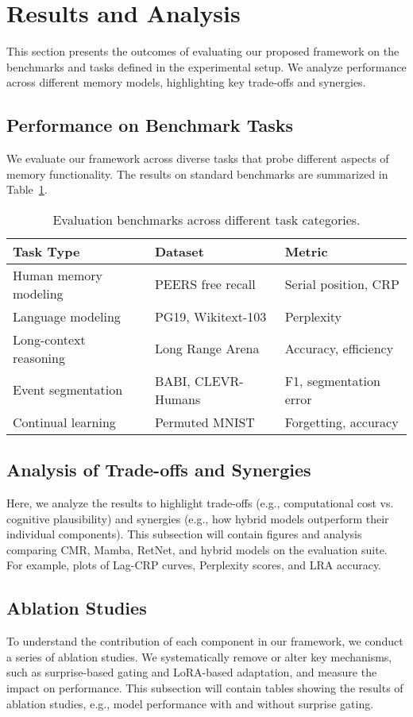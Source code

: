 \section{Results and Analysis}
This section presents the outcomes of evaluating our proposed framework on the benchmarks and tasks defined in the experimental setup. We analyze performance across different memory models, highlighting key trade-offs and synergies.

\subsection{Performance on Benchmark Tasks}
We evaluate our framework across diverse tasks that probe different aspects of memory functionality. The results on standard benchmarks are summarized in Table~\ref{tab:benchmarks}.

\begin{table}[h]
\centering
\begin{tabular}{@{}lll@{}}
\toprule
\textbf{Task Type} & \textbf{Dataset} & \textbf{Metric} \\
\midrule
Human memory modeling & PEERS free recall & Serial position, CRP \\
Language modeling & PG19, Wikitext-103 & Perplexity \\
Long-context reasoning & Long Range Arena & Accuracy, efficiency \\
Event segmentation & BABI, CLEVR-Humans & F1, segmentation error \\
Continual learning & Permuted MNIST & Forgetting, accuracy \\
\bottomrule
\end{tabular}
\caption{Evaluation benchmarks across different task categories.}
\label{tab:benchmarks}
\end{table}

\subsection{Analysis of Trade-offs and Synergies}
Here, we analyze the results to highlight trade-offs (e.g., computational cost vs. cognitive plausibility) and synergies (e.g., how hybrid models outperform their individual components). This subsection will contain figures and analysis comparing CMR, Mamba, RetNet, and hybrid models on the evaluation suite. For example, plots of Lag-CRP curves, Perplexity scores, and LRA accuracy.

\subsection{Ablation Studies}
To understand the contribution of each component in our framework, we conduct a series of ablation studies. We systematically remove or alter key mechanisms, such as surprise-based gating and LoRA-based adaptation, and measure the impact on performance. This subsection will contain tables showing the results of ablation studies, e.g., model performance with and without surprise gating.

